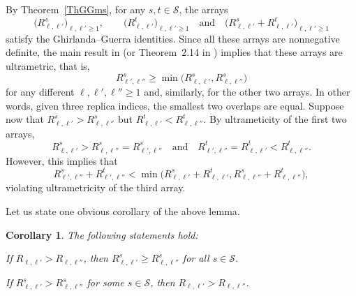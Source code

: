 \documentclass[aop,MSNbibl,dvips]{arximspdf}
\def\cal{\mathscr}
\newcommand{\spe}{{\cal S}}
\newtheorem{corollary}{Corollary}
\begin{document}
\begin{pf}
By Theorem~\ref{ThGGms}, for any $s,t\in\spe$, the arrays
%
\[
\bigl(R^s_{\ell,\ell'} \bigr)_{\ell,\ell'\geq1},\qquad
\bigl(R^t_{\ell
,\ell
'} \bigr)_{\ell,\ell'\geq1}\quad \mbox{and}\quad
\bigl(R^s_{\ell,\ell'}+R^t_{\ell,\ell'}
\bigr)_{\ell,\ell'\geq1}
\]
%
satisfy the Ghirlanda--Guerra identities. Since all these arrays are
nonnegative definite, the main result in \cite{PUltra} (or Theorem~2.14
in \cite{SKmodel}) implies that these arrays are ultrametric, that is,
%
\begin{equation}
R^s_{\ell',\ell''} \geq\min \bigl(R^s_{\ell,\ell'},
R^s_{\ell
,\ell''} \bigr) \label{ultram}
\end{equation}
%
for any different $\ell,\ell',\ell'' \geq1$ and, similarly, for the
other two arrays. In other words, given three replica indices, the
smallest two overlaps are equal. Suppose now that $R^s_{\ell,\ell'}>
R^s_{\ell,\ell''}$ but $R^t_{\ell,\ell'}< R^t_{\ell,\ell''}$. By
ultrameticity of the first two arrays,
%
\[
R^s_{\ell,\ell'}> R^s_{\ell,\ell''} =
R^s_{\ell',\ell''}\quad \mbox{and}\quad R^t_{\ell',\ell''} =
R^t_{\ell,\ell'}< R^t_{\ell,\ell''}.
\]
%
However, this implies that
%
\[
R^s_{\ell',\ell''} + R^t_{\ell',\ell''}< \min \bigl(
R^s_{\ell
,\ell
'}+R^t_{\ell,\ell'},
R^s_{\ell,\ell''} + R^t_{\ell,\ell''} \bigr),
\]
%
violating ultrametricity of the third array.
\end{pf}



Let us state one obvious corollary of the above lemma.

\begin{corollary}\label{CorSynch}
The following statements hold:
%
\begin{longlist}[(a)]
%
\item[(a)] If $R_{\ell,\ell'}> R_{\ell,\ell''}$, then $R^s_{\ell
,\ell
'}\geq R^s_{\ell,\ell''}$ for all $s\in\spe$.

\item[(b)] If $R^s_{\ell,\ell'}> R^s_{\ell,\ell''}$ for some $s\in
\spe
$, then $R_{\ell,\ell'}> R_{\ell,\ell''}$.
\end{longlist}
%
\end{corollary}
%
\end{document}
